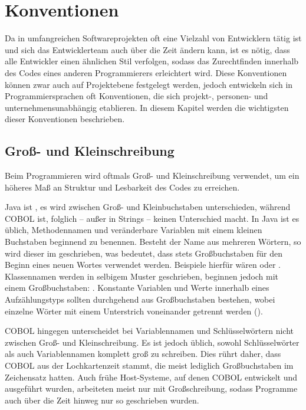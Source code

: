\section{Konventionen}
Da in umfangreichen Softwareprojekten oft eine Vielzahl von Entwicklern tätig ist und sich das Entwicklerteam auch über die Zeit ändern kann, ist es nötig, dass alle Entwickler einen ähnlichen Stil verfolgen, sodass das Zurechtfinden innerhalb des Codes eines anderen Programmierers erleichtert wird. Diese Konventionen können zwar auch auf Projektebene festgelegt werden, jedoch entwickeln sich in Programmiersprachen oft Konventionen, die sich projekt-, personen- und unternehmensunabhängig etablieren. In diesem Kapitel werden die wichtigsten dieser Konventionen beschrieben.

\subsection*{Groß- und Kleinschreibung}
Beim Programmieren wird oftmals Groß- und Kleinschreibung verwendet, um ein höheres Maß an Struktur und Lesbarkeit des Codes zu erreichen.

Java ist , \dahe  es wird zwischen Groß- und Kleinbuchstaben unterschieden, während COBOL  ist, folglich -- außer in Strings -- keinen Unterschied macht. In Java ist es üblich, Methodennamen und veränderbare Variablen mit einem kleinen Buchstaben beginnend zu benennen. Besteht der Name aus mehreren Wörtern, so wird dieser im  geschrieben, was bedeutet, dass stets Großbuchstaben für den Beginn eines neuen Wortes verwendet werden. Beispiele hierfür wären  oder . Klassennamen werden in selbigem Muster geschrieben, beginnen jedoch mit einem Großbuchstaben: . Konstante Variablen und Werte innerhalb eines Aufzählungstyps sollten durchgehend aus Großbuchstaben bestehen, wobei einzelne Wörter mit einem Unterstrich voneinander getrennt werden (). 

COBOL hingegen unterscheidet bei Variablennamen und Schlüsselwörtern nicht zwischen Groß- und Kleinschreibung. Es ist jedoch üblich, sowohl Schlüsselwörter als auch Variablennamen komplett groß zu schreiben. Dies rührt daher, dass COBOL aus der Lochkartenzeit stammt, die meist lediglich Großbuchstaben im Zeichensatz hatten. Auch frühe Host-Systeme, auf denen COBOL entwickelt und ausgeführt wurden, arbeiteten meist nur mit Großschreibung, sodass Programme auch über die Zeit hinweg nur so geschrieben wurden.


